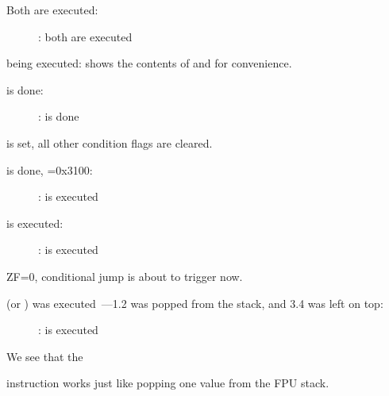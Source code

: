 ﻿\clearpage
{}
\myindex{\olly}

Both \FLD are executed:

\begin{figure}[H]
\centering
{}
\caption{\olly: both \FLD are executed}
\label{fig:FPU_comparison_Ox_case1_olly1}
\end{figure}

\FCOM being executed: 
\olly shows the contents of  and  %
for convenience.

\clearpage
\FCOM is done:

\begin{figure}[H]
\centering
{}
\caption{\olly: \FCOM is done}
\label{fig:FPU_comparison_Ox_case1_olly2}
\end{figure}

\Czero is set, all other condition flags are cleared.

\clearpage
\FNSTSW is done, =0x3100:

\begin{figure}[H]
\centering
{}
\caption{\olly: \FNSTSW is executed}
\label{fig:FPU_comparison_Ox_case1_olly3}
\end{figure}

\clearpage
\TEST is executed:

\begin{figure}[H]
\centering
{}
\caption{\olly: \TEST is executed}
\label{fig:FPU_comparison_Ox_case1_olly4}
\end{figure}

ZF=0, conditional jump is about to trigger now.

\clearpage
{} (or \FSTP {}) was executed~---1.2 was popped from the stack, and 3.4 was left on top:

\begin{figure}[H]
\centering
{}
\caption{\olly: \FSTP is executed}
\label{fig:FPU_comparison_Ox_case1_olly5}
\end{figure}

We see that the  

instruction works just like popping one value from the FPU stack.

